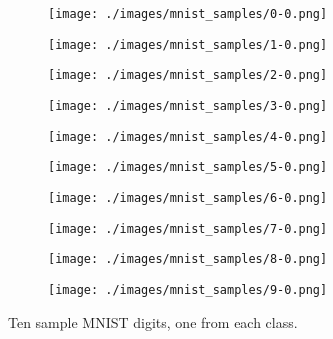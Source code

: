 \begin{figure}[H]
    \centering
    \begin{subfigure}{.10\textwidth}
        \centering
        \texttt{[image: ./images/mnist\_samples/0-0.png]}
    \end{subfigure}%
    \begin{subfigure}{.10\textwidth}
        \centering
        \texttt{[image: ./images/mnist\_samples/1-0.png]}
    \end{subfigure}%
    \begin{subfigure}{.10\textwidth}
        \centering
        \texttt{[image: ./images/mnist\_samples/2-0.png]}
    \end{subfigure}%
    \begin{subfigure}{.10\textwidth}
        \centering
        \texttt{[image: ./images/mnist\_samples/3-0.png]}
    \end{subfigure}%
    \begin{subfigure}{.10\textwidth}
        \centering
        \texttt{[image: ./images/mnist\_samples/4-0.png]}
    \end{subfigure}%
    \begin{subfigure}{.10\textwidth}
        \centering
        \texttt{[image: ./images/mnist\_samples/5-0.png]}
    \end{subfigure}%
    \begin{subfigure}{.10\textwidth}
        \centering
        \texttt{[image: ./images/mnist\_samples/6-0.png]}
    \end{subfigure}%
    \begin{subfigure}{.10\textwidth}
        \centering
        \texttt{[image: ./images/mnist\_samples/7-0.png]}
    \end{subfigure}%
    \begin{subfigure}{.10\textwidth}
        \centering
        \texttt{[image: ./images/mnist\_samples/8-0.png]}
    \end{subfigure}%
    \begin{subfigure}{.10\textwidth}
        \centering
        \texttt{[image: ./images/mnist\_samples/9-0.png]}
    \end{subfigure}%
    \caption{Ten sample MNIST digits, one from each class.}
    \label{fig:mnist_samples}
\end{figure}

